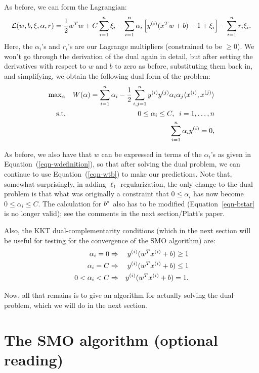 \documentclass{article}
\begin{document}
As before, we can form the Lagrangian:
\[
{\cal L}(w,b,\xi,\alpha,r) = \frac{1}{2} w^Tw + C \sum_{i=1}^{n} \xi_i - \sum_{i=1}^{n} \alpha_i \left[{y^{(i)}}(x^Tw+b)-1+\xi_i\right] -  \sum_{i=1}^{n} r_i \xi_i.
\]
Here, the $\alpha_i$'s and $r_i$'s are our Lagrange multipliers (constrained to be $\geq 0$).  We
won't go through the derivation of the dual again in detail, but after setting the derivatives with respect
to $w$ and $b$ to zero as before, substituting them back in, and simplifying, we obtain the
following dual form of the problem:
\begin{eqnarray*}
&\hbox{max}_{\alpha}& W(\alpha) =
\sum_{i=1}^{n} \alpha_i - \frac{1}{2} \sum_{i,j=1}^{n} y^{(i)} y^{(j)} \alpha_i \alpha_j \langle x^{(i)},  x^{(j)} \rangle \\
&\;\;\;\;\hbox{s.t.}& 0 \leq \alpha_i \leq C, \;\; i=1,\ldots,{n} \\
&&                          \sum_{i=1}^{n} \alpha_i {y^{(i)}} = 0,
\end{eqnarray*}

As before, we also have that $w$ can be expressed in terms of the $\alpha_i$'s as given in
Equation~(\ref{eqn-wdefinition}), so that after solving the dual problem, we can continue to
use Equation~(\ref{eqn-wtb}) to make our predictions.  Note that, somewhat surprisingly, in
adding $\ell_1$ regularization, the only change to the dual problem is that what was
originally a constraint that $0 \leq \alpha_i$ has now become $0 \leq \alpha_i \leq C$.
The calculation for ${b^{\ast}}$ also has to be modified (Equation~\ref{eqn-bstar} is no longer valid);
see the comments in the next section/Platt's paper.

Also, the KKT dual-complementarity conditions (which in the next section will be useful for testing
for the convergence of the SMO algorithm) are:
\begin{eqnarray}
\alpha_i = 0 &\Rightarrow& {y^{(i)}}(w^T{x^{(i)}} + b) \geq 1  \label{eqn-l1kkt-1}\\
\alpha_i = C &\Rightarrow& {y^{(i)}}(w^T{x^{(i)}} + b) \leq 1  \\
0 < \alpha_i < C &\Rightarrow& {y^{(i)}}(w^T{x^{(i)}} + b) = 1.  \label{eqn-l1kkt-3}
\end{eqnarray}

Now, all that remains is to give an algorithm for actually solving the dual problem, which we
will do in the next section.

\section{The SMO algorithm (optional reading)}
\end{document}
